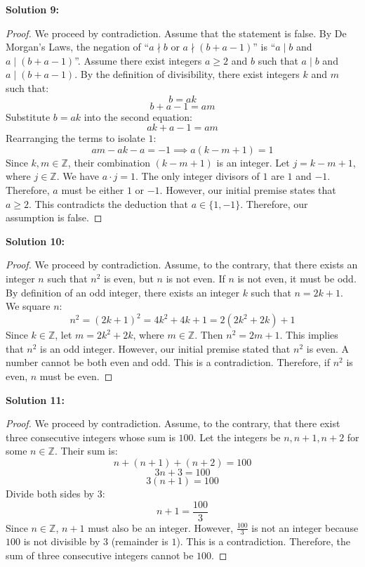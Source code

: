 \documentclass[11pt]{article}
\theoremstyle{definition}
\begin{document}
\textbf{Solution 9:}
\begin{proof}
We proceed by contradiction. Assume that the statement is false. By De Morgan's Laws, the negation of ``$a \nmid b$ or $a \nmid (b + a - 1)$'' is ``$a \mid b$ and $a \mid (b + a - 1)$''. Assume there exist integers $a \ge 2$ and $b$ such that $a \mid b$ and $a \mid (b + a - 1)$. By the definition of divisibility, there exist integers $k$ and $m$ such that:
\[ b = ak \]
\[ b + a - 1 = am \]
Substitute $b = ak$ into the second equation:
\[ ak + a - 1 = am \]
Rearranging the terms to isolate $1$:
\[ am - ak - a = -1 \implies a(k - m + 1) = 1 \]
Since $k, m \in \mathbb{Z}$, their combination $(k - m + 1)$ is an integer. Let $j = k - m + 1$, where $j \in \mathbb{Z}$. We have $a \cdot j = 1$. The only integer divisors of $1$ are $1$ and $-1$. Therefore, $a$ must be either $1$ or $-1$. However, our initial premise states that $a \ge 2$. This contradicts the deduction that $a \in \{1, -1\}$. Therefore, our assumption is false.
\end{proof}

\textbf{Solution 10:}
\begin{proof}
We proceed by contradiction. Assume, to the contrary, that there exists an integer $n$ such that $n^2$ is even, but $n$ is not even. If $n$ is not even, it must be odd. By definition of an odd integer, there exists an integer $k$ such that $n = 2k + 1$. We square $n$:
\[ n^2 = (2k + 1)^2 = 4k^2 + 4k + 1 = 2(2k^2 + 2k) + 1 \]
Since $k \in \mathbb{Z}$, let $m = 2k^2 + 2k$, where $m \in \mathbb{Z}$. Then $n^2 = 2m + 1$. This implies that $n^2$ is an odd integer. However, our initial premise stated that $n^2$ is even. A number cannot be both even and odd. This is a contradiction. Therefore, if $n^2$ is even, $n$ must be even.
\end{proof}

\textbf{Solution 11:}
\begin{proof}
We proceed by contradiction. Assume, to the contrary, that there exist three consecutive integers whose sum is $100$. Let the integers be $n, n+1, n+2$ for some $n \in \mathbb{Z}$. Their sum is:
\[ n + (n + 1) + (n + 2) = 100 \]
\[ 3n + 3 = 100 \]
\[ 3(n + 1) = 100 \]
Divide both sides by $3$:
\[ n + 1 = \frac{100}{3} \]
Since $n \in \mathbb{Z}$, $n+1$ must also be an integer. However, $\frac{100}{3}$ is not an integer because $100$ is not divisible by $3$ (remainder is $1$). This is a contradiction. Therefore, the sum of three consecutive integers cannot be $100$.
\end{proof}
\end{document}
